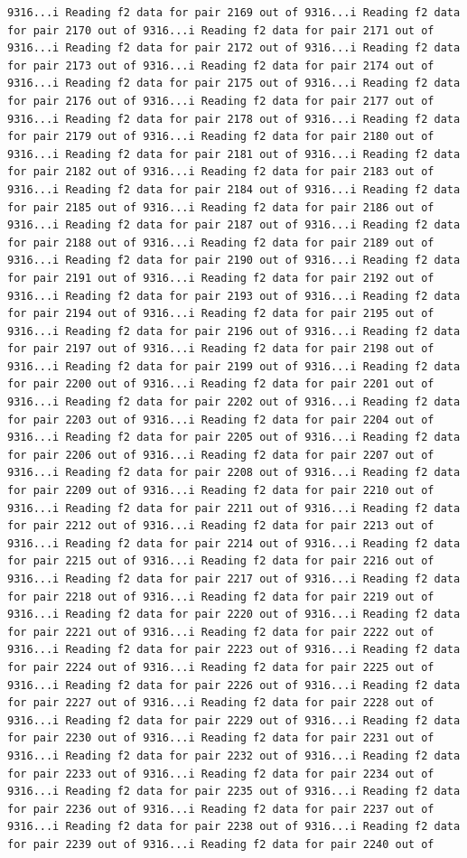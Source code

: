 \documentclass[
]{article}
\begin{document}
\begin{verbatim}
9316...i Reading f2 data for pair 2169 out of 9316...i Reading f2 data for pair 2170 out of 9316...i Reading f2 data for pair 2171 out of 9316...i Reading f2 data for pair 2172 out of 9316...i Reading f2 data for pair 2173 out of 9316...i Reading f2 data for pair 2174 out of 9316...i Reading f2 data for pair 2175 out of 9316...i Reading f2 data for pair 2176 out of 9316...i Reading f2 data for pair 2177 out of 9316...i Reading f2 data for pair 2178 out of 9316...i Reading f2 data for pair 2179 out of 9316...i Reading f2 data for pair 2180 out of 9316...i Reading f2 data for pair 2181 out of 9316...i Reading f2 data for pair 2182 out of 9316...i Reading f2 data for pair 2183 out of 9316...i Reading f2 data for pair 2184 out of 9316...i Reading f2 data for pair 2185 out of 9316...i Reading f2 data for pair 2186 out of 9316...i Reading f2 data for pair 2187 out of 9316...i Reading f2 data for pair 2188 out of 9316...i Reading f2 data for pair 2189 out of 9316...i Reading f2 data for pair 2190 out of 9316...i Reading f2 data for pair 2191 out of 9316...i Reading f2 data for pair 2192 out of 9316...i Reading f2 data for pair 2193 out of 9316...i Reading f2 data for pair 2194 out of 9316...i Reading f2 data for pair 2195 out of 9316...i Reading f2 data for pair 2196 out of 9316...i Reading f2 data for pair 2197 out of 9316...i Reading f2 data for pair 2198 out of 9316...i Reading f2 data for pair 2199 out of 9316...i Reading f2 data for pair 2200 out of 9316...i Reading f2 data for pair 2201 out of 9316...i Reading f2 data for pair 2202 out of 9316...i Reading f2 data for pair 2203 out of 9316...i Reading f2 data for pair 2204 out of 9316...i Reading f2 data for pair 2205 out of 9316...i Reading f2 data for pair 2206 out of 9316...i Reading f2 data for pair 2207 out of 9316...i Reading f2 data for pair 2208 out of 9316...i Reading f2 data for pair 2209 out of 9316...i Reading f2 data for pair 2210 out of 9316...i Reading f2 data for pair 2211 out of 9316...i Reading f2 data for pair 2212 out of 9316...i Reading f2 data for pair 2213 out of 9316...i Reading f2 data for pair 2214 out of 9316...i Reading f2 data for pair 2215 out of 9316...i Reading f2 data for pair 2216 out of 9316...i Reading f2 data for pair 2217 out of 9316...i Reading f2 data for pair 2218 out of 9316...i Reading f2 data for pair 2219 out of 9316...i Reading f2 data for pair 2220 out of 9316...i Reading f2 data for pair 2221 out of 9316...i Reading f2 data for pair 2222 out of 9316...i Reading f2 data for pair 2223 out of 9316...i Reading f2 data for pair 2224 out of 9316...i Reading f2 data for pair 2225 out of 9316...i Reading f2 data for pair 2226 out of 9316...i Reading f2 data for pair 2227 out of 9316...i Reading f2 data for pair 2228 out of 9316...i Reading f2 data for pair 2229 out of 9316...i Reading f2 data for pair 2230 out of 9316...i Reading f2 data for pair 2231 out of 9316...i Reading f2 data for pair 2232 out of 9316...i Reading f2 data for pair 2233 out of 9316...i Reading f2 data for pair 2234 out of 9316...i Reading f2 data for pair 2235 out of 9316...i Reading f2 data for pair 2236 out of 9316...i Reading f2 data for pair 2237 out of 9316...i Reading f2 data for pair 2238 out of 9316...i Reading f2 data for pair 2239 out of 9316...i Reading f2 data for pair 2240 out of 
\end{verbatim}
\end{document}
